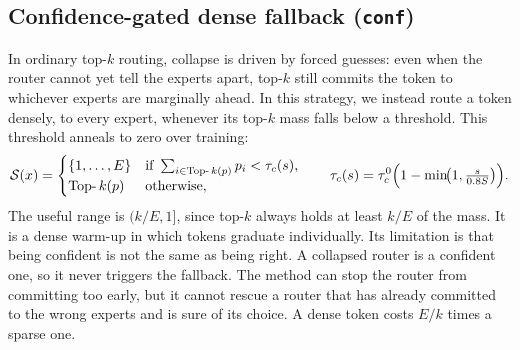 \documentclass[10pt]{article}
\theoremstyle{definition}
\theoremstyle{remark}
\newcommand{\topk}{\operatorname{Top-}k}
\newcommand{\code}[1]{\texttt{#1}}
\begin{document}
\subsection{Confidence-gated dense fallback (\code{conf})}
In ordinary top-$k$ routing, collapse is driven by forced guesses: even when the router cannot yet tell the experts apart, top-$k$ still commits the token to whichever experts are marginally ahead. In this strategy, we instead route a token densely, to every expert, whenever its top-$k$ mass falls below a threshold. This threshold anneals to zero over training:
\begin{equation}
\mathcal{S}(x)=\begin{cases}\{1,\dots,E\} & \text{if } \sum_{i\in\topk(p)}p_i<\tau_c(s),\\ \topk(p)&\text{otherwise,}\end{cases}
\qquad \tau_c(s)=\tau_c^0\Bigl(1-\min\!\bigl(1,\tfrac{s}{0.8S}\bigr)\Bigr).
\end{equation}
The useful range is $(k/E,1]$, since top-$k$ always holds at least $k/E$ of the mass. It is a dense warm-up \citep{nie2021evomoe} in which tokens graduate individually. Its limitation is that being confident is not the same as being right. A collapsed router is a confident one, so it never triggers the fallback. The method can stop the router from committing too early, but it cannot rescue a router that has already committed to the wrong experts and is sure of its choice. A dense token costs $E/k$ times a sparse one.
\end{document}
